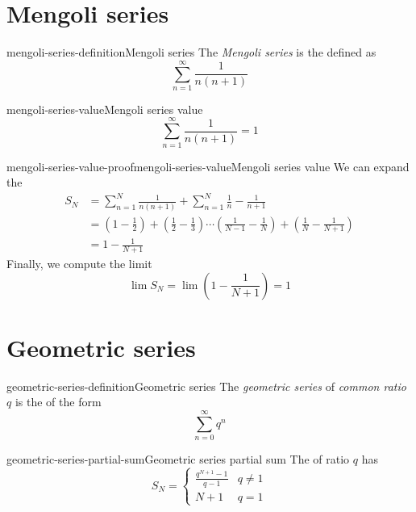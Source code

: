 \documentclass[preview]{standalone}
\begin{document}
\genpage

\section{Mengoli series}

\begin{snippetdefinition}{mengoli-series-definition}{Mengoli series}
    The \emph{Mengoli series} is the \series defined as
    \[
        \sum_{n=1}^\infty \frac{1}{n(n+1)}
    \]
\end{snippetdefinition}

\begin{snippetproposition}{mengoli-series-value}{Mengoli series value}
    \[
        \sum_{n=1}^\infty \frac{1}{n(n+1)} = 1
    \]
\end{snippetproposition}

\begin{snippetproof}{mengoli-series-value-proof}{mengoli-series-value}{Mengoli series value}
    We can expand the \partialsum
    \begin{align*}
        S_N &= \sum_{n=1}^N \frac{1}{n(n+1)} + \sum_{n=1}^N \frac{1}{n} - \frac{1}{n+1} \\
        &= \left(1 - \frac{1}{2}\right) + \left(\frac{1}{2} - \frac{1}{3}\right) \cdots \left(\frac{1}{N-1} - \frac{1}{N}\right)
        + \left(\frac{1}{N} - \frac{1}{N+1}\right) \\
        &= 1 - \frac{1}{N+1}
    \end{align*}
    Finally, we compute the limit
    \[
        \lim S_N = \lim \left(1 - \frac{1}{N+1}\right) = 1
    \]
\end{snippetproof}

\section{Geometric series}

\begin{snippetdefinition}{geometric-series-definition}{Geometric series}
    The \emph{geometric series} of \emph{common ratio} \(q\) is the \series of the form
    \[
        \sum_{n=0}^\infty q^n
    \]
\end{snippetdefinition}


\begin{snippetproposition}{geometric-series-partial-sum}{Geometric series partial sum}
    The \geometricseries of ratio \(q\) has \partialsum
    \[
        S_N = \begin{cases}
            \frac{q^{N+1}-1}{q-1} & q \neq 1 \\
            N + 1 & q = 1
        \end{cases}
    \]
\end{snippetproposition}
\end{document}
